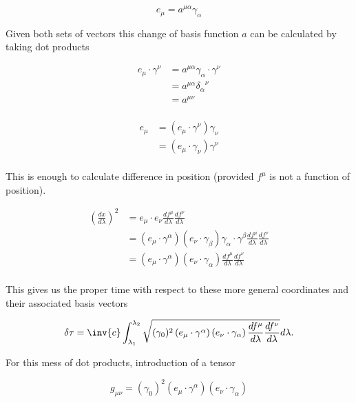 \documentclass{article}      %
\begin{document}
\begin{equation*}
e_\mu = a^{\mu\alpha} \gamma_\alpha
\end{equation*}

Given both sets of vectors this change of basis function $a$ can be calculated by taking dot products

\begin{align*}
e_\mu \cdot \gamma^{\nu} 
&= a^{\mu\alpha} \gamma_\alpha \cdot \gamma^{\nu} \\
&= a^{\mu\alpha} {\delta_\alpha}^\nu \\
&= a^{\mu\nu} \\
\end{align*}

\begin{align}
e_\mu
&= \left(e_\mu \cdot \gamma^{\nu}\right) \gamma_\nu \\
&= \left(e_\mu \cdot \gamma_{\nu}\right) \gamma^\nu \\
\end{align}

This is enough to calculate difference in position (provided $f^{\mu}$ is not
a function of position).

\begin{align*}
\left(\frac{dx}{d\lambda} \right)^2
&= 
e_\mu \cdot e_\nu
\frac{df^{\mu}}{d\lambda} \frac{df^{\nu}}{d\lambda} \\
&= 
\left(e_\mu \cdot \gamma^{\alpha}\right)
\left(e_\nu \cdot \gamma_{\beta}\right)
\gamma_\alpha \cdot \gamma^\beta
\frac{df^{\mu}}{d\lambda} \frac{df^{\nu}}{d\lambda} \\
&= 
\left(e_\mu \cdot \gamma^{\alpha}\right)
\left(e_\nu \cdot \gamma_{\alpha}\right)
\frac{df^{\mu}}{d\lambda} \frac{df^{\nu}}{d\lambda} \\
\end{align*}

This gives us the proper time with respect to these more general coordinates and their associated basis vectors

\begin{equation}
\delta \tau = \inv{c} \int_{\lambda_1}^{\lambda_2} 
\sqrt{
(\gamma_{0})^2 
\left(e_\mu \cdot \gamma^{\alpha}\right)
\left(e_\nu \cdot \gamma_{\alpha}\right)
\frac{df^{\mu}}{d\lambda} \frac{df^{\nu}}{d\lambda} } d\lambda.
\end{equation}

For this mess of dot products, introduction of a tensor

\begin{equation}
g_{\mu\nu} =
(\gamma_{0})^2 
\left(e_\mu \cdot \gamma^{\alpha}\right)
\left(e_\nu \cdot \gamma_{\alpha}\right)
\end{equation}
\end{document}

